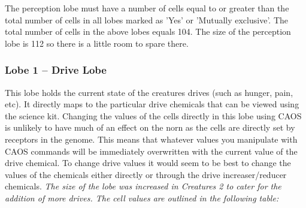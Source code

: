 \documentclass[11pt,twoside,a4paper]{article}
\begin{document}
The perception lobe must have a number of cells equal to or greater than the total number of cells in all lobes marked as 'Yes' or 'Mutually exclusive'. The total number of cells in the above lobes equals 104. The size of the perception lobe is 112 so there is a little room to spare there.

\subsubsection{Lobe 1 -- Drive Lobe}

This lobe holds the current state of the creatures drives (such as hunger, pain, etc). It directly maps to the particular drive chemicals that can be viewed using the science kit. Changing the values of the cells directly in this lobe using CAOS is unlikely to have much of an effect on the norn as the cells are directly set by receptors in the genome. This means that whatever values you manipulate with CAOS commands will be immediately overwritten with the current value of the drive chemical. To change drive values it would seem to be best to change the values of the chemicals either directly or through the drive increaser/reducer chemicals. \emph{The size of the lobe was increased in Creatures 2 to cater for the addition of more drives. The cell values are outlined in the following table:}
\end{document}
